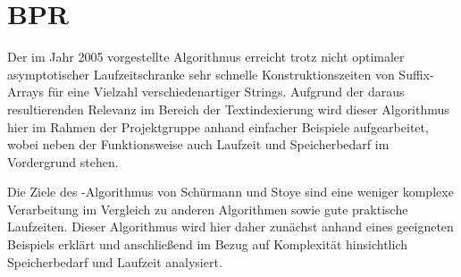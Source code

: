 \section{BPR}



Der  im Jahr 2005 vorgestellte Algorithmus \bpr \cite{saca:2} erreicht trotz nicht optimaler asymptotischer Laufzeitschranke sehr schnelle Konstruktionszeiten von Suffix-Arrays für eine Vielzahl verschiedenartiger Strings. Aufgrund der daraus resultierenden Relevanz im Bereich der Textindexierung wird dieser Algorithmus hier im Rahmen der Projektgruppe \sacabench anhand einfacher Beispiele aufgearbeitet, wobei neben der Funktionsweise auch Laufzeit und Speicherbedarf im Vordergrund stehen.\par
Die Ziele des \bpr-Algorithmus von Schürmann und Stoye sind eine weniger komplexe Verarbeitung im Vergleich zu anderen Algorithmen sowie gute praktische Laufzeiten. Dieser Algorithmus wird hier daher zunächst anhand eines geeigneten Beispiels erklärt und anschließend im Bezug auf Komplexität hinsichtlich Speicherbedarf und Laufzeit analysiert.





%
